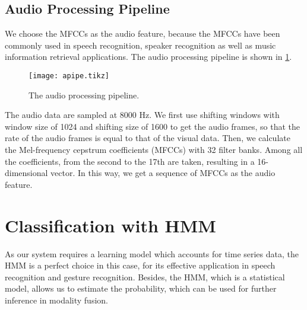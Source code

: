 \documentclass[12pt,final,twoside]{report}
\begin{document}
\subsection{Audio Processing Pipeline}
We choose the MFCCs as the audio feature, because the MFCCs have been commonly used in speech recognition, speaker recognition as well as music information retrieval applications. The audio processing pipeline is shown in \cref{fig:apipe}.

\begin{figure}[t]
  \centering
  \texttt{[image: apipe.tikz]}
  \caption{The audio processing pipeline.}
  \label{fig:apipe}
\end{figure}

The audio data are sampled at 8000 Hz. We first use shifting windows with window size of 1024 and shifting size of 1600 to get the audio frames, so that the rate of the audio frames is equal to that of the visual data. Then, we calculate the Mel-frequency cepstrum coefficients (MFCCs) with 32 filter banks. Among all the coefficients, from the second to the 17th are taken, resulting in a 16-dimensional vector. In this way, we get a sequence of MFCCs as the audio feature.

\section{Classification with HMM}
As our system requires a learning model which accounts for time series data, the HMM is a perfect choice in this case, for its effective application in speech recognition and gesture recognition. Besides, the HMM, which is a statistical model, allows us to estimate the probability, which can be used for further inference in modality fusion.
\end{document}
